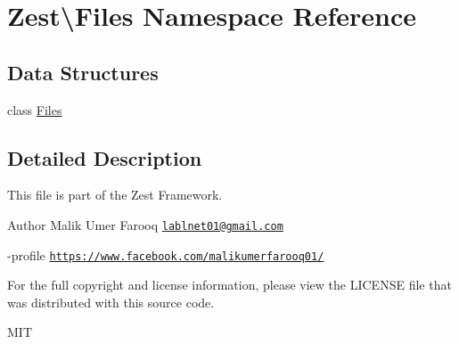 \hypertarget{namespace_zest_1_1_files}{}\section{Zest\textbackslash{}Files Namespace Reference}
\label{namespace_zest_1_1_files}
\subsection*{Data Structures}
\begin{DoxyCompactItemize}
\item 
class \mbox{\hyperlink{class_zest_1_1_files_1_1_files}{Files}}
\end{DoxyCompactItemize}


\subsection{Detailed Description}
This file is part of the Zest Framework.

\begin{DoxyAuthor}{Author}
Malik Umer Farooq \href{mailto:lablnet01@gmail.com}{\tt lablnet01@gmail.\+com} 

-\/profile \href{https://www.facebook.com/malikumerfarooq01/}{\tt https\+://www.\+facebook.\+com/malikumerfarooq01/}
\end{DoxyAuthor}
For the full copyright and license information, please view the L\+I\+C\+E\+N\+SE file that was distributed with this source code.

M\+IT 